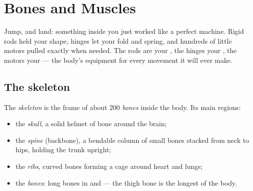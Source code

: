 \chapter{Bones and Muscles}\label{ch:g3:bones-and-muscles}

Jump, and land: something inside you just worked like a perfect
machine. Rigid rods held your shape, hinges let your  fold
and spring, and hundreds of little motors pulled exactly when
needed. The rods are your , the hinges your , the
motors your  --- the body's equipment for every movement
it will ever make.

\section{The skeleton}

\begin{definition}\label{def:g3:bones-and-muscles:skeleton}
The \emph{skeleton} is the frame of about $200$
\emph{bones} inside the body. Its main regions:
\begin{itemize}
  \item the \emph{skull}, a solid helmet of bone
        around the brain;
  \item the \emph{spine} (backbone), a bendable
        column of small bones stacked from neck to hips, holding
        the trunk upright;
  \item the \emph{ribs}, curved bones forming a cage
        around heart and lungs;
  \item the \emph{ bones}: long bones in  and  ---
        the thigh bone is the longest of the body.
\end{itemize}
\end{definition}

